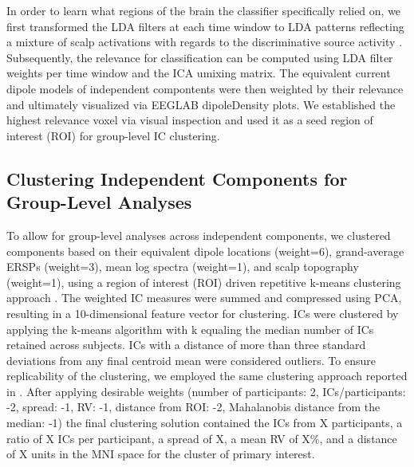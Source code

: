 In order to learn what regions of the brain the classifier specifically relied on, we first transformed the LDA filters at each time window to LDA patterns reflecting a mixture of scalp activations with regards to the discriminative source activity \cite{Haufe2014a, Zander2016, Krol2019}. Subsequently, the relevance for classification can be computed using LDA filter weights per time window and the ICA umixing matrix. The equivalent current dipole models of independent compontents were then weighted by their relevance and ultimately visualized via EEGLAB dipoleDensity plots. We established the highest relevance voxel via visual inspection and used it as a seed region of interest (ROI) for group-level IC clustering. %

\subsection{Clustering Independent Components for Group-Level Analyses}
To allow for group-level analyses across independent components, we clustered components based on their equivalent dipole locations (weight=6), grand-average ERSPs (weight=3), mean log spectra (weight=1), and scalp topography (weight=1), using a region of interest (ROI) driven repetitive k-means clustering approach \cite{Gramann2018}. The weighted IC measures were summed and compressed using PCA, resulting in a 10-dimensional feature vector for clustering. ICs were clustered by applying the k-means algorithm with k equaling the median number of ICs retained across subjects. ICs with a distance of more than three standard deviations from any final centroid mean were considered outliers. To ensure replicability of the clustering, we employed the same clustering approach reported in \cite{Gramann2018}. After applying desirable weights (number of participants: 2, ICs/participants: -2, spread: -1, RV: -1, distance from ROI: -2, Mahalanobis distance from the median: -1) the final clustering solution contained the ICs from X participants, a ratio of X ICs per participant, a spread of X, a mean RV of X\%, and a distance of X units in the MNI space for the cluster of primary interest.
